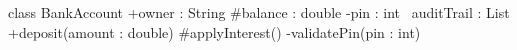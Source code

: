 \documentclass{scrartcl}
\begin{document}
\begin{plantuml}
class BankAccount {
  +owner : String
  #balance : double
  -pin : int
  ~auditTrail : List
  +deposit(amount : double)
  #applyInterest()
  -validatePin(pin : int)
}
\end{plantuml}
\end{document}
